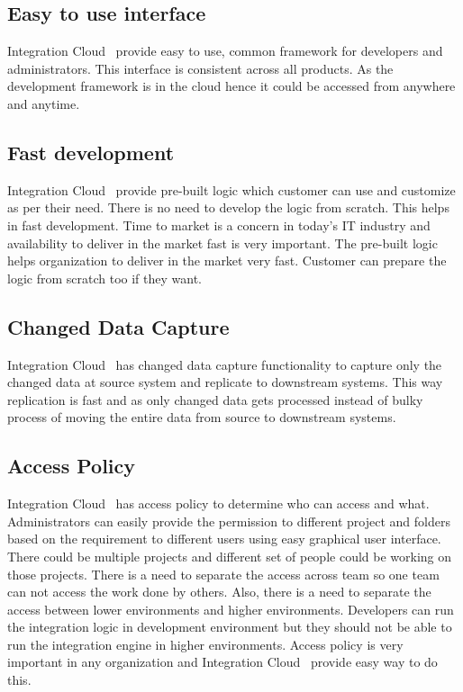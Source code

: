 \subsection{Easy to use interface}
Integration Cloud~\cite{hid-sp18-511-iics} provide easy to use, common framework for developers and administrators. This interface is consistent across all products. As the development framework is in the cloud hence it could be accessed from anywhere and anytime.

\subsection{Fast development}
Integration Cloud~\cite{hid-sp18-511-iics} provide pre-built logic which customer can use and customize as per their need. There is no need to develop the logic from scratch. This helps in fast development. Time to market is a concern in today's IT industry and availability to deliver in the market fast is very important. The pre-built logic helps organization to deliver in the market very fast. Customer can prepare the logic from scratch too if they want. 

\subsection{Changed Data Capture}

Integration Cloud~\cite{hid-sp18-511-iics} has changed data capture functionality to capture only the changed data at source system and replicate to downstream systems. This way replication is fast and as only changed data gets processed instead of bulky process of moving the entire data from source to downstream systems.

\subsection{Access Policy}

Integration Cloud~\cite{hid-sp18-511-iics} has access policy to determine who can access and what. Administrators can easily provide the permission to different project and folders based on the requirement to different users using easy graphical user interface. There could be multiple projects and different set of people could be working on those projects. There is a need to separate the access across team so one team can not access the work done by others. Also, there is a need to separate the access between lower environments and higher environments. Developers can run the integration logic in development environment but they should not be able to run the integration engine in higher environments. Access policy is very important in any organization and Integration Cloud~\cite{hid-sp18-511-iics} provide easy way to do this.

